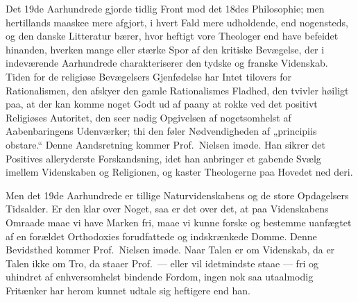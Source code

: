 Det 19de Aarhundrede gjorde tidlig Front mod det 18des Philosophie; men
hertillands maaskee mere afgjort, i hvert Fald mere udholdende, end
nogensteds, og den danske Litteratur bærer, hvor heftigt vore Theologer end
have befeidet hinanden, hverken mange eller stærke Spor af den kritiske
Bevægelse, der i indeværende Aarhundrede charakteriserer den tydske og
franske Videnskab. Tiden for de religiøse Bevægelsers Gjenfødelse har Intet
tilovers for Rationalismen, den afskyer den gamle Rationalismes Fladhed, den
tvivler høiligt paa, at der kan komme noget Godt ud af paany at rokke ved det
positivt Religiøses Autoritet, den seer nødig Opgivelsen af nogetsomhelst af
Aabenbaringens Udenværker; thi den føler Nødvendigheden af „principiis
obstare.“ Denne
Aandsretning kommer Prof.\ Nielsen imøde. Han sikrer det Positives
alleryderste Forskandsning, idet han anbringer et gabende Svælg imellem
Videnskaben og Religionen, og kaster Theologerne paa Hovedet ned deri.

Men det 19de Aarhundrede er tillige Naturvidenskabens og de store
Opdagelsers Tidsalder. Er den klar over Noget, saa er det over det, at paa
Videnskabens Omraade maae vi have Marken fri, maae vi kunne forske og
bestemme uanfægtet af en forældet Orthodoxies forudfattede og indskrænkede
Domme. Denne Bevidsthed kommer Prof.\ Nielsen imøde. Naar Talen er om
Videnskab, da er Talen ikke om Tro, da staaer Prof.\ --- eller vil
idetmindste staae --- fri og uhindret af enhversomhelst bindende Fordom,
ingen nok saa utaalmodig Fritænker har herom kunnet udtale sig heftigere end
han.

